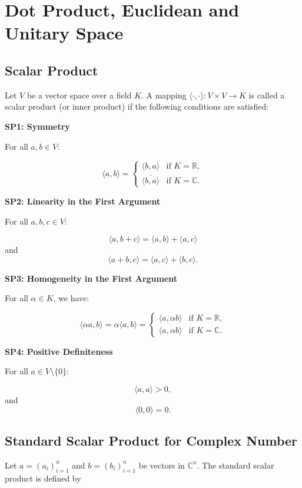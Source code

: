 \section{Dot Product, Euclidean and Unitary Space}

\subsection{Scalar Product}

Let $V$ be a vector space over a field $K$. A mapping $\langle \cdot, \cdot \rangle : V \times V \to K$ is called a scalar product (or inner product) if the following conditions are satisfied:

\textbf{SP1: Symmetry}

For all $a, b \in V$:

\[
\langle a, b \rangle = 
\begin{cases}
\langle b, a \rangle & \text{if } K = \mathbb{R}, \\
\overline{\langle b, a \rangle} & \text{if } K = \mathbb{C}.
\end{cases}
\]

\textbf{SP2: Linearity in the First Argument}

For all $a, b, c \in V$:

\[
\langle a, b + c \rangle = \langle a, b \rangle + \langle a, c \rangle
\]
and
\[
\langle a + b, c \rangle = \langle a, c \rangle + \langle b, c \rangle.
\]

\textbf{SP3: Homogeneity in the First Argument}

For all $\alpha \in K$, we have:

\[
\langle \alpha a, b \rangle = \alpha \langle a, b \rangle = 
\begin{cases}
\langle a, \alpha b \rangle & \text{if } K = \mathbb{R}, \\
\langle a, \alpha b \rangle & \text{if } K = \mathbb{C}.
\end{cases}
\]

\textbf{SP4: Positive Definiteness}

For all $a \in V \setminus \{0\}$:

\[
\langle a, a \rangle > 0,
\]
and
\[
\langle 0, 0 \rangle = 0.
\]

\subsection{Standard Scalar Product for Complex Number}

Let \( a = (a_i)_{i=1}^n \) and \( b = (b_i)_{i=1}^n \) be vectors in \( \mathbb{C}^n \). The standard scalar product is defined by

